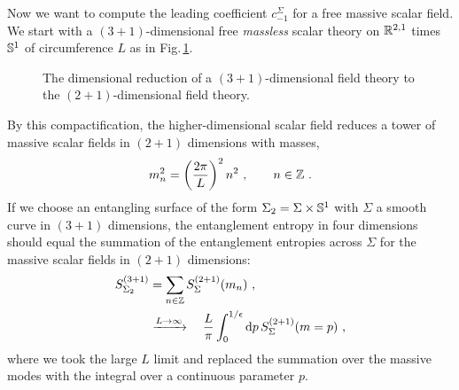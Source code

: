 Now we want to compute the leading coefficient $c_{-1}^\Sigma$ for a free massive scalar field. 
We start with a $(3+1)$-dimensional free \emph{massless} scalar theory on $\mathbb{R}^{2,1}$ times $\mathbb{S}^1$ of circumference $L$ as in Fig.\,\ref{fig:KKmodes}.
\begin{figure}[htbp]
\centering
{}
\caption{The dimensional reduction of a $(3+1)$-dimensional field theory to the $(2+1)$-dimensional field theory.
}
\label{fig:KKmodes}
\end{figure}
By this compactification, the higher-dimensional scalar field reduces a tower of massive scalar fields in $(2+1)$ dimensions with masses,
\begin{align}
m_n^2 = \left(\frac{2\pi}{L}\right)^2 n^2 \ , \qquad n\in \mathbb{Z} \ .
\end{align}
If we choose an entangling surface of the form $\Sigma_2 = \Sigma \times \mathbb{S}^1$ with $\Sigma$ a smooth curve in $(3+1)$ dimensions, the entanglement entropy in four dimensions should equal the summation of the entanglement entropies across $\Sigma$ for the massive scalar fields in $(2+1)$ dimensions:
\begin{align}\label{DimRed}
\begin{aligned}
S_{\Sigma_2}^{(3+1)} &= \sum_{n\in\BZ} S_{\Sigma}^{(2+1)} (m_n) \ ,\\
	&\xrightarrow{L\to \infty} \quad \frac{L}{\pi} \int_0^{1/\epsilon} \d p\, S_{\Sigma}^{(2+1)} (m=p) \ ,
\end{aligned}
\end{align}
where we took the large $L$ limit and replaced the summation over the massive modes with the integral over a continuous parameter $p$.

